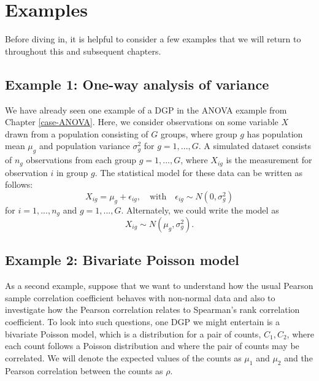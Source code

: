 \documentclass[
]{book}
\begin{document}
\section{Examples}\label{DGP-examples}

Before diving in, it is helpful to consider a few examples that we will return to throughout this and subsequent chapters.

\subsection{Example 1: One-way analysis of variance}\label{ANOVA-example}

We have already seen one example of a DGP in the ANOVA example from Chapter \ref{case-ANOVA}. Here, we consider observations on some variable \(X\) drawn from a population consisting of \(G\) groups, where group \(g\) has population mean \(\mu_g\) and population variance \(\sigma_g^2\) for \(g = 1,...,G\).
A simulated dataset consists of \(n_g\) observations from each group \(g = 1,...,G\), where \(X_{ig}\) is the measurement for observation \(i\) in group \(g\).
The statistical model for these data can be written as follows:
\[ 
X_{ig} = \mu_g + \epsilon_{ig}, \quad \mbox{with} \quad \epsilon_{ig} \sim N( 0, \sigma^2_g )
\]
for \(i = 1,...,n_g\) and \(g = 1,...,G\).
Alternately, we could write the model as
\[
X_{ig} \sim N( \mu_g, \sigma_g^2 ).
\]

\subsection{Example 2: Bivariate Poisson model}\label{BVPois-example}

As a second example, suppose that we want to understand how the usual Pearson sample correlation coefficient behaves with non-normal data and also to investigate how the Pearson correlation relates to Spearman's rank correlation coefficient.
To look into such questions, one DGP we might entertain is a bivariate Poisson model, which is a distribution for a pair of counts, \(C_1,C_2\), where each count follows a Poisson distribution and where the pair of counts may be correlated.
We will denote the expected values of the counts as \(\mu_1\) and \(\mu_2\) and the Pearson correlation between the counts as \(\rho\).
\end{document}
